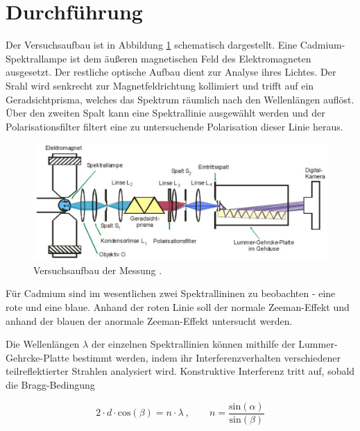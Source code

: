 \section{Durchführung}
\label{sec:Durchführung}

Der Versuchsaufbau ist in Abbildung \ref{fig:aufbau} schematisch dargestellt.
Eine Cadmium-Spektrallampe ist dem äußeren magnetischen Feld des Elektromagneten ausgesetzt.
Der restliche optische Aufbau dient zur Analyse ihres Lichtes. Der Srahl wird senkrecht zur
Magnetfeldrichtung kollimiert und trifft
auf ein Geradsichtprisma, welches das Spektrum räumlich nach den Wellenlängen auflöst.
Über den zweiten Spalt kann eine Spektrallinie ausgewählt werden und der Polarisationsfilter
filtert eine zu untersuchende Polarisation dieser Linie heraus.

\vspace{-5pt}
\begin{figure}[H]
    \centering
    \includegraphics[scale=0.3]{content/aufbau.png}
    \caption{Versuchsaufbau der Messung \cite{alt}.}
    \label{fig:aufbau}
\end{figure}

Für Cadmium sind im wesentlichen zwei Spektrallininen zu beobachten - eine rote und eine blaue.
Anhand der roten Linie soll der normale Zeeman-Effekt und anhand der blauen der anormale 
Zeeman-Effekt untersucht werden. 

Die Wellenlängen $\lambda$ der einzelnen Spektrallinien können mithilfe der Lummer-Gehrcke-Platte 
bestimmt werden, indem ihr Interferenzverhalten verschiedener teilreflektierter Strahlen
analysiert wird. Konstruktive Interferenz tritt auf, sobald die Bragg-Bedingung

\vspace{-5pt}
\begin{equation}
    2 \cdot d \cdot \text{cos}(\beta) = n \cdot \lambda \: , 
    \qquad n = \frac{\text{sin}(\alpha)}{\text{sin}(\beta)}
\end{equation}

